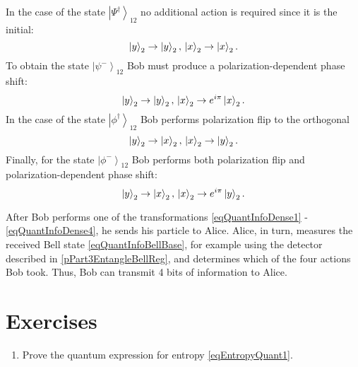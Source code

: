 In the case of the state $\left|\Psi^{\dag}\right>_{12}$ no
additional action is required since it is the initial: 
\begin{equation}
\ket{y}_2 \rightarrow \ket{y}_2, \, 
\ket{x}_2 \rightarrow \ket{x}_2.
\label{eqQuantInfoDense1}
\end{equation}
To obtain the state $\left|\psi^{-}\right>_{12}$ Bob must
produce a polarization-dependent phase shift:
\begin{equation}
\ket{y}_2 \rightarrow \ket{y}_2, \, 
\ket{x}_2 \rightarrow e^{i \pi}\ket{x}_2.
\label{eqQuantInfoDense2}
\end{equation}
In the case of the state $\left|\phi^{\dag}\right>_{12}$ Bob performs
polarization flip to the orthogonal
\begin{equation}
\ket{y}_2 \rightarrow \ket{x}_2, \, 
\ket{x}_2 \rightarrow \ket{y}_2.
\label{eqQuantInfoDense3}
\end{equation}
Finally, for the state $\left|\phi^{-}\right>_{12}$ Bob performs
both polarization flip and polarization-dependent phase
shift:
\begin{equation}
\ket{y}_2 \rightarrow \ket{x}_2, \, 
\ket{x}_2 \rightarrow e^{i \pi}\ket{y}_2.
\label{eqQuantInfoDense4}
\end{equation}

After Bob performs one of the transformations
\eqref{eqQuantInfoDense1} - \ref{eqQuantInfoDense4}, he sends his
particle to Alice. Alice, in turn, measures the received Bell
state \eqref{eqQuantInfoBellBase}, for example using the detector
described in \ref{pPart3EntangleBellReg}, and determines which of the four
actions Bob took. Thus, Bob can transmit 4 bits of information to Alice.




\section{Exercises}
\begin{enumerate}
\item Prove the quantum expression for entropy \eqref{eqEntropyQuant1}.  
\end{enumerate}


